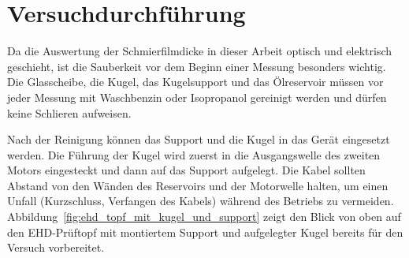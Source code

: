 \section{Versuchdurchführung}
\label{sec:versuchdurchfuehrung}

Da die Auswertung der Schmierfilmdicke in dieser Arbeit optisch und elektrisch geschieht, ist die Sauberkeit vor dem Beginn einer Messung besonders wichtig.
Die Glasscheibe, die Kugel, das Kugelsupport und das Ölreservoir müssen vor jeder Messung mit Waschbenzin oder Isopropanol gereinigt werden und dürfen keine Schlieren aufweisen.

Nach der Reinigung können das Support und die Kugel in das Gerät eingesetzt werden.
Die Führung der Kugel wird zuerst in die Ausgangswelle des zweiten Motors eingesteckt und dann auf das Support aufgelegt.
Die Kabel sollten Abstand von den Wänden des Reservoirs und der Motorwelle halten, um einen Unfall (Kurzschluss, Verfangen des Kabels) während des Betriebs zu vermeiden.
Abbildung~\ref{fig:ehd_topf_mit_kugel_und_support} zeigt den Blick von oben auf den EHD-Prüftopf mit montiertem Support und aufgelegter Kugel bereits für den Versuch vorbereitet.

